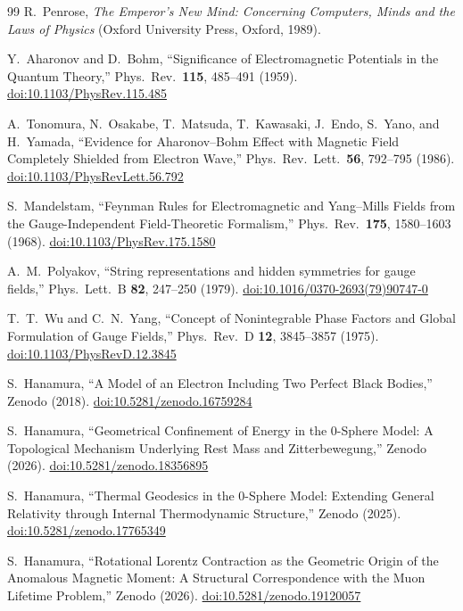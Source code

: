 \documentclass[%
 reprint, amsmath,amssymb, aps, prb, ]{revtex4-2}
\numberwithin{equation}{section}
\begin{document}
\begin{thebibliography}{99}
R.~Penrose, \textit{The Emperor's New Mind: Concerning Computers, Minds and the Laws of Physics} (Oxford University Press, Oxford, 1989).

Y.~Aharonov and D.~Bohm, ``Significance of Electromagnetic Potentials in the Quantum Theory,'' Phys.\ Rev.\ \textbf{115}, 485--491 (1959). \href{https://doi.org/10.1103/PhysRev.115.485}{doi:10.1103/PhysRev.115.485}

A.~Tonomura, N.~Osakabe, T.~Matsuda, T.~Kawasaki, J.~Endo, S.~Yano, and H.~Yamada, ``Evidence for Aharonov--Bohm Effect with Magnetic Field Completely Shielded from Electron Wave,'' Phys.\ Rev.\ Lett.\ \textbf{56}, 792--795 (1986). \href{https://doi.org/10.1103/PhysRevLett.56.792}{doi:10.1103/PhysRevLett.56.792}

S.~Mandelstam, ``Feynman Rules for Electromagnetic and Yang--Mills Fields from the Gauge-Independent Field-Theoretic Formalism,'' Phys.\ Rev.\ \textbf{175}, 1580--1603 (1968). \href{https://doi.org/10.1103/PhysRev.175.1580}{doi:10.1103/PhysRev.175.1580}

A.~M.~Polyakov, ``String representations and hidden symmetries for gauge fields,'' Phys.\ Lett.\ B \textbf{82}, 247--250 (1979). \href{https://doi.org/10.1016/0370-2693(79)90747-0}{doi:10.1016/0370-2693(79)90747-0}

T.~T.~Wu and C.~N.~Yang, ``Concept of Nonintegrable Phase Factors and Global Formulation of Gauge Fields,'' Phys.\ Rev.\ D \textbf{12}, 3845--3857 (1975). \href{https://doi.org/10.1103/PhysRevD.12.3845}{doi:10.1103/PhysRevD.12.3845}

S.~Hanamura, ``A Model of an Electron Including Two Perfect Black Bodies,'' Zenodo (2018). \href{https://doi.org/10.5281/zenodo.16759284}{doi:10.5281/zenodo.16759284}

S.~Hanamura, ``Geometrical Confinement of Energy in the 0-Sphere Model: A Topological Mechanism Underlying Rest Mass and Zitterbewegung,'' Zenodo (2026). \href{https://doi.org/10.5281/zenodo.18356895}{doi:10.5281/zenodo.18356895}

S.~Hanamura, ``Thermal Geodesics in the 0-Sphere Model: Extending General Relativity through Internal Thermodynamic Structure,'' Zenodo (2025). \href{https://doi.org/10.5281/zenodo.17765349}{doi:10.5281/zenodo.17765349}

S.~Hanamura, ``Rotational Lorentz Contraction as the Geometric Origin of the Anomalous Magnetic Moment: A Structural Correspondence with the Muon Lifetime Problem,'' Zenodo (2026). \href{https://doi.org/10.5281/zenodo.19120057}{doi:10.5281/zenodo.19120057}


\end{thebibliography}
\end{document}
